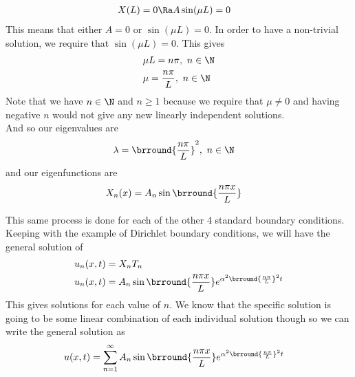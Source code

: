 \begin{enumerate}
\begin{align*}
        &X(L)=0\Ra A\sin(\mu L)=0
    \end{align*}
    This means that either $A=0$ or $\sin(\mu L)=0$. In order to have a non-trivial solution, we require that $\sin(\mu L)=0$. This gives
    \begin{align*}
        &\mu L=n\pi,\ n\in\N\\
        &\mu=\frac{n\pi}{L},\ n\in\N
    \end{align*}
    Note that we have $n\in\N$ and $n\geq1$ because we require that $\mu\neq 0$ and having negative $n$ would not give any new linearly independent solutions.\\
    And so our eigenvalues are
    \begin{align*}
        &\lambda=\brround{\frac{n\pi}{L}}^2,\ n\in\N
    \end{align*}
    and our eigenfunctions are
    \begin{align*}
        &X_n(x)=A_n\sin\brround{\frac{n\pi x}{L}}
    \end{align*}
\end{enumerate}
This same process is done for each of the other 4 standard boundary conditions.\\

Keeping with the example of Dirichlet boundary conditions, we will have the general solution of
\begin{align*}
    &u_n(x,t)=X_nT_n\\
    &u_n(x,t)=A_n\sin\brround{\frac{n\pi x}{L}}e^{\alpha^2\brround{\frac{n\pi}{L}}^2t}
\end{align*}
This gives solutions for each value of $n$. We know that the specific solution is going to be some linear combination of each individual solution though so we can write the general solution as
\begin{align*}
    &u(x,t)=\sum_{n=1}^\infty A_n\sin\brround{\frac{n\pi x}{L}}e^{\alpha^2\brround{\frac{n\pi}{L}}^2t}
\end{align*}

